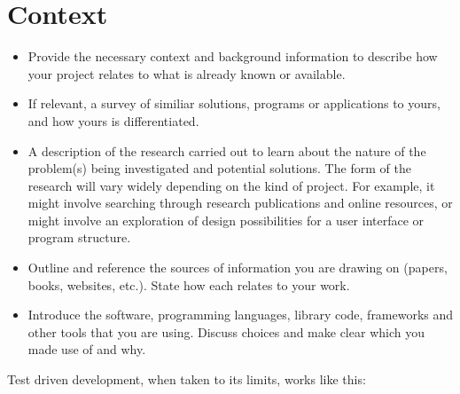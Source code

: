 \section{Context}
\label{sec:context}

\begin{framed}
	\begin{itemize}
		\item Provide the necessary context and background information to describe how your project relates to what is already known or available.
		\item If relevant, a survey of similiar solutions, programs or applications to yours, and how yours is differentiated.
		\item A description of the research carried out to learn about the nature of the problem(s) being investigated and potential solutions. The form of the research will vary widely depending on the kind of project. For example, it might involve searching through research publications and online resources, or might involve an exploration of design possibilities for a user interface or program structure.
		\item Outline and reference the sources of information you are drawing on (papers, books, websites, etc.). State how each relates to your work.
		\item Introduce the software, programming languages, library code, frameworks and other tools that you are using. Discuss choices and make clear which you made use of and why.
	\end{itemize}
\end{framed}

Test driven development, when taken to its limits, works like this:

